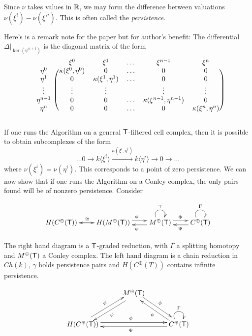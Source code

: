 Since $\nu$ takes values in ${\mathbb{R}}$, we may form the difference between valuations $\nu(\xi^i) - \nu(\xi'^i)$.  This is often called the {\em persistence}.  

\begin{rem}
Here's is a remark note for the paper but for author's benefit:
The differential $\Delta|_{\ker(\psi^{n+1})}$ is the diagonal matrix of the form
\[
\begin{blockarray}{cccccc}
& \xi^0 & \xi^1 & \ldots & \xi^{n-1} & \xi^n \\
\begin{block}{c(ccccc)}
 \eta^0 & \kappa(\xi^0,\eta^0) & 0 & \ldots & 0 & 0 \\
 \eta^1 & 0 & \kappa(\xi^1,\eta^1) & \ldots & 0 & 0  \\
 \vdots &  \vdots & \vdots & & \vdots & \vdots  \\
  \eta^{n-1} & 0 & 0 & \ldots & \kappa(\xi^{n-1},\eta^{n-1}) & 0  \\
  \eta^n & 0 & 0 & \ldots & 0 & \kappa(\xi^n,\eta^n)  \\
\end{block}
\end{blockarray}
 \]

\end{rem}

If one runs the Algorithm on a general ${\mathsf T}$-filtered cell complex, then it is possible to obtain subcomplexes of the form
 \[
\ldots 0 \to k\langle \xi^i\rangle \xrightarrow{ \kappa (\xi^i,\eta^i)} k\langle \eta^i\rangle \to 0\to \ldots
\]
where $\nu(\xi^i)=\nu(\eta^i)$.  This corresponds to a point of zero persistence.  We can now show that if one runs the Algorithm on a Conley complex, the only pairs found will be of nonzero persistence.  Consider

 \[
\xymatrixrowsep{0.03in}
\xymatrixcolsep{0.3in}
\xymatrix{
H(C^\oplus(\sT)) \ar[r]^{\cong} &\ar[l]  H(M^\oplus(\sT))  \ar[r]<3pt>^{\phi} & \ar[l]<3pt>^{\psi} M^\oplus(\sT) \ar@(ul,ur)^{\gamma}  \ar[r]<3pt>^{\Phi} & \ar[l]<3pt>^{\Psi} C^\oplus(\sT) \ar@(ul,ur)^{\Gamma} 
}
\]

 The right hand diagram is a ${\mathsf T}$-graded reduction, with $\Gamma$ a splitting homotopy and $M^\oplus({\mathsf T})$ a Conley complex.  The left hand diagram is a chain reduction in $Ch(k)$, $\gamma$ holds persistence pairs and $H(C^\oplus(T))$ contains infinite persistence.

 \[
\xymatrixrowsep{.4in}
\xymatrixcolsep{0.4in}
\xymatrix{
&  \ar[dl]<3pt>^{\psi}  M^\oplus(\sT)  \ar[dr]<3pt>^{\phi}  &\\
H(C^\oplus(\sT)) \ar[ur]<3pt>^{\phi} \ar[rr]<3pt>^{\phi}  & & \ar[ll]<3pt>^{\Psi} C^\oplus(\sT) \ar@(ul,ur)^{\Gamma} \ar[ul]<3pt>^{\psi}
}
\]

